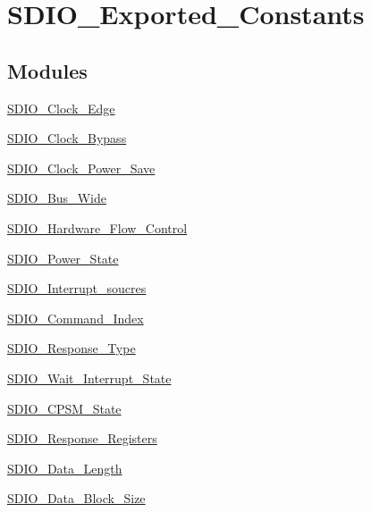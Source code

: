 \hypertarget{group___s_d_i_o___exported___constants}{\section{S\-D\-I\-O\-\_\-\-Exported\-\_\-\-Constants}
\label{group___s_d_i_o___exported___constants}
}
\subsection*{Modules}
\begin{DoxyCompactItemize}
\item 
\hyperlink{group___s_d_i_o___clock___edge}{S\-D\-I\-O\-\_\-\-Clock\-\_\-\-Edge}
\item 
\hyperlink{group___s_d_i_o___clock___bypass}{S\-D\-I\-O\-\_\-\-Clock\-\_\-\-Bypass}
\item 
\hyperlink{group___s_d_i_o___clock___power___save}{S\-D\-I\-O\-\_\-\-Clock\-\_\-\-Power\-\_\-\-Save}
\item 
\hyperlink{group___s_d_i_o___bus___wide}{S\-D\-I\-O\-\_\-\-Bus\-\_\-\-Wide}
\item 
\hyperlink{group___s_d_i_o___hardware___flow___control}{S\-D\-I\-O\-\_\-\-Hardware\-\_\-\-Flow\-\_\-\-Control}
\item 
\hyperlink{group___s_d_i_o___power___state}{S\-D\-I\-O\-\_\-\-Power\-\_\-\-State}
\item 
\hyperlink{group___s_d_i_o___interrupt__soucres}{S\-D\-I\-O\-\_\-\-Interrupt\-\_\-soucres}
\item 
\hyperlink{group___s_d_i_o___command___index}{S\-D\-I\-O\-\_\-\-Command\-\_\-\-Index}
\item 
\hyperlink{group___s_d_i_o___response___type}{S\-D\-I\-O\-\_\-\-Response\-\_\-\-Type}
\item 
\hyperlink{group___s_d_i_o___wait___interrupt___state}{S\-D\-I\-O\-\_\-\-Wait\-\_\-\-Interrupt\-\_\-\-State}
\item 
\hyperlink{group___s_d_i_o___c_p_s_m___state}{S\-D\-I\-O\-\_\-\-C\-P\-S\-M\-\_\-\-State}
\item 
\hyperlink{group___s_d_i_o___response___registers}{S\-D\-I\-O\-\_\-\-Response\-\_\-\-Registers}
\item 
\hyperlink{group___s_d_i_o___data___length}{S\-D\-I\-O\-\_\-\-Data\-\_\-\-Length}
\item 
\hyperlink{group___s_d_i_o___data___block___size}{S\-D\-I\-O\-\_\-\-Data\-\_\-\-Block\-\_\-\-Size}
\item 

\end{DoxyCompactItemize}

